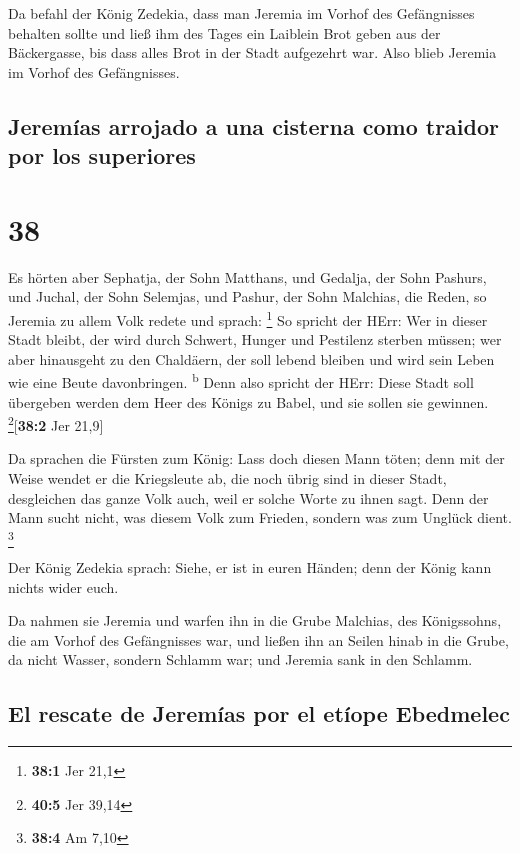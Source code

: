  Da befahl der König Zedekia, dass man Jeremia im Vorhof
des Gefängnisses behalten sollte und ließ ihm des Tages ein Laiblein
Brot geben aus der Bäckergasse, bis dass alles Brot in der Stadt
aufgezehrt war. Also blieb Jeremia im Vorhof des Gefängnisses.

\hypertarget{jeremuxedas-arrojado-a-una-cisterna-como-traidor-por-los-superiores}{%
\subsection{Jeremías arrojado a una cisterna como traidor por los
superiores}\label{jeremuxedas-arrojado-a-una-cisterna-como-traidor-por-los-superiores}}

\hypertarget{section-37}{%
\section{38}\label{section-37}}

 Es hörten aber Sephatja, der Sohn Matthans, und Gedalja,
der Sohn Pashurs, und Juchal, der Sohn Selemjas, und Pashur, der Sohn
Malchias, die Reden, so Jeremia zu allem Volk redete und sprach:
\footnote{\textbf{38:1} Jer 21,1}  So spricht der HErr:
Wer in dieser Stadt bleibt, der wird durch Schwert, Hunger und Pestilenz
sterben müssen; wer aber hinausgeht zu den Chaldäern, der soll lebend
bleiben und wird sein Leben wie eine Beute davonbringen.
\textsuperscript{b}  Denn also spricht der HErr: Diese
Stadt soll übergeben werden dem Heer des Königs zu Babel, und sie sollen
sie gewinnen. \footnote{\textbf{40:5} Jer 39,14}{[}\textbf{38:2} Jer
21,9{]}

 Da sprachen die Fürsten zum König: Lass doch diesen Mann
töten; denn mit der Weise wendet er die Kriegsleute ab, die noch übrig
sind in dieser Stadt, desgleichen das ganze Volk auch, weil er solche
Worte zu ihnen sagt. Denn der Mann sucht nicht, was diesem Volk zum
Frieden, sondern was zum Unglück dient. \footnote{\textbf{38:4} Am 7,10}

 Der König Zedekia sprach: Siehe, er ist in euren Händen;
denn der König kann nichts wider euch.

 Da nahmen sie Jeremia und warfen ihn in die Grube
Malchias, des Königssohns, die am Vorhof des Gefängnisses war, und
ließen ihn an Seilen hinab in die Grube, da nicht Wasser, sondern
Schlamm war; und Jeremia sank in den Schlamm.

\hypertarget{el-rescate-de-jeremuxedas-por-el-etuxedope-ebedmelec}{%
\subsection{El rescate de Jeremías por el etíope
Ebedmelec}\label{el-rescate-de-jeremuxedas-por-el-etuxedope-ebedmelec}}

